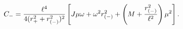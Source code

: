 \begin{equation}
C_- = {\ell^4 \over {4(r_+^2+r_{(-)}^2)^2}}
\left[
J \mu \omega + \omega^2 r_{(-)}^2 + \left ( M + {r_{(-)}^2 \over \ell^2} \right ) \mu^2
\right] .
\label{cm}
\end{equation}

